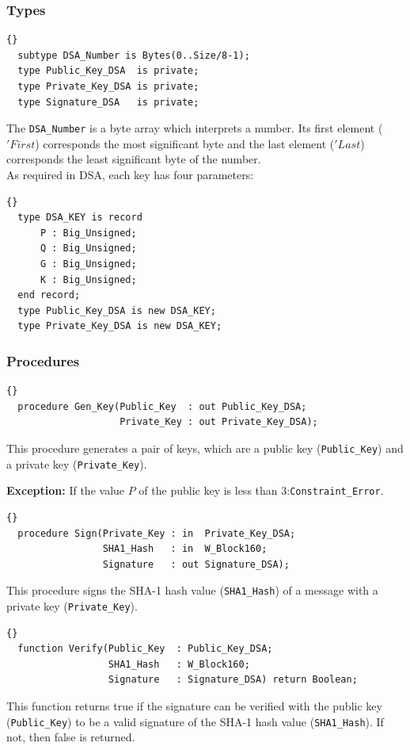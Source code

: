 \subsubsection*{Types}
\begin{lstlisting}{}
  subtype DSA_Number is Bytes(0..Size/8-1);
  type Public_Key_DSA  is private;
  type Private_Key_DSA is private;
  type Signature_DSA   is private;
\end{lstlisting}
The \texttt{DSA\_Number} is a byte array which interprets a
number. Its first element ($'First$) corresponds the most significant
byte and the last element ($'Last$) corresponds the least significant
byte of the number.\\ As required in DSA, each key has four
parameters:
\begin{lstlisting}{}
  type DSA_KEY is record
      P : Big_Unsigned;
      Q : Big_Unsigned;
      G : Big_Unsigned;
      K : Big_Unsigned;
  end record;
  type Public_Key_DSA is new DSA_KEY;
  type Private_Key_DSA is new DSA_KEY;
\end{lstlisting}

\subsubsection*{Procedures}
\begin{lstlisting}{}
  procedure Gen_Key(Public_Key  : out Public_Key_DSA;
                    Private_Key : out Private_Key_DSA);
\end{lstlisting}
This procedure generates a pair of keys, which are a public key
(\texttt{Public\_Key}) and a private key
(\texttt{Private\_Key}).

\noindent\textbf{Exception:} If the value $P$ of the
public key is less than 3:\quad\texttt{Constraint\_Error}.


\hhline
\begin{lstlisting}{}
  procedure Sign(Private_Key : in  Private_Key_DSA;
                 SHA1_Hash   : in  W_Block160;
                 Signature   : out Signature_DSA);
\end{lstlisting}
This procedure signs the SHA-1 hash value (\texttt{SHA1\_Hash}) of a
message with a private key (\texttt{Private\_Key}).

\hhline
\begin{lstlisting}{}
  function Verify(Public_Key  : Public_Key_DSA;
                  SHA1_Hash   : W_Block160;
                  Signature   : Signature_DSA) return Boolean;
\end{lstlisting}
This function returns true if the signature can be verified with the
public key (\texttt{Public\_Key}) to be a valid signature of the SHA-1
hash value (\texttt{SHA1\_Hash}). If not, then false is
returned.\\

